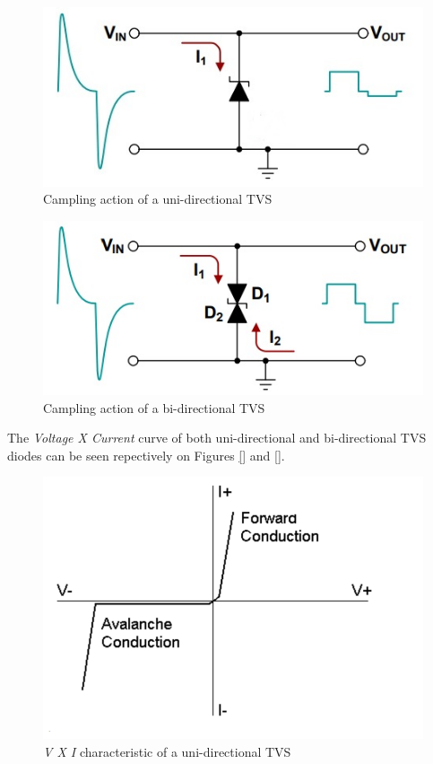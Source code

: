 		\begin{figure}[htbp]
			\centering
				\includegraphics[scale=0.6]{figuras/fig-uni-tvs-clamp}
			\caption{Campling action of a uni-directional TVS \cite{uni-tvs-clamp}}
			\label{fig:uni-tvs-clamp}
		\end{figure}

		\begin{figure}[htbp]
			\centering
				\includegraphics[scale=0.6]{figuras/fig-bi-tvs-clamp}
			\caption{Campling action of a bi-directional TVS \cite{bi-tvs-clamp}}
			\label{fig:bi-tvs-clamp}
		\end{figure}

		\par
		The \textit{Voltage X Current} curve of both uni-directional and bi-directional TVS diodes can be seen repectively on Figures \ref{} and \ref{}.

		\begin{figure}[htbp]
			\centering
				\includegraphics[scale=0.6]{figuras/fig-uni-tvs-curve}
			\caption{\textit{V X I} characteristic of a uni-directional TVS \cite{uni-tvs-curve}}
			\label{fig:uni-tvs-curve}
		\end{figure}

